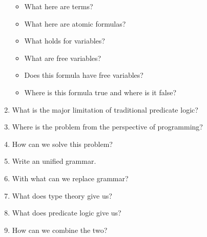 \documentclass[fleqn]{article}
\begin{document}
\begin{enumerate}
    \begin{itemize}
        \item What here are terms?
        \item What here are atomic formulas?
        \item What holds for variables?
        \item What are free variables?
        \item Does this formula have free variables?
        \item Where is this formula true and where is it false?
    \end{itemize} 
    \item What is the major limitation of traditional predicate logic?
    \item Where is the problem from the perspective of programming?
    \item How can we solve this problem?
    \item Write an unified grammar.
    \item With what can we replace grammar?
    \item What does type theory give us?
    \item What does predicate logic give us?
    \item How can we combine the two? 
\end{enumerate}
\end{document}
